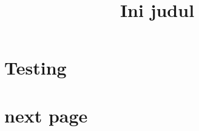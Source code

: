 \documentclass[11pt]{scrartcl}
\title{Ini judul}
\begin{document}
\maketitle



\newpage
\section{Testing}
\newpage
\section{next page}
\end{document}
